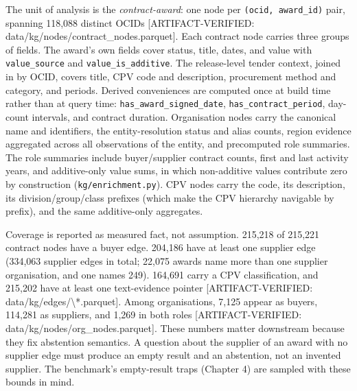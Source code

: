 The unit of analysis is the \emph{contract-award}: one node per \texttt{(ocid, award\_id)} pair, spanning 118,088 distinct OCIDs [ARTIFACT-VERIFIED: data/kg/nodes/contract\_nodes.parquet]. Each contract node carries three groups of fields. The award's own fields cover status, title, dates, and value with \texttt{value\_source} and \texttt{value\_is\_additive}. The release-level tender context, joined in by OCID, covers title, CPV code and description, procurement method and category, and periods. Derived conveniences are computed once at build time rather than at query time: \texttt{has\_award\_signed\_date}, \texttt{has\_contract\_period}, day-count intervals, and contract duration. Organisation nodes carry the canonical name and identifiers, the entity-resolution status and alias counts, region evidence aggregated across all observations of the entity, and precomputed role summaries. The role summaries include buyer/supplier contract counts, first and last activity years, and additive-only value sums, in which non-additive values contribute zero by construction (\texttt{kg/enrichment.py}). CPV nodes carry the code, its description, its division/group/class prefixes (which make the CPV hierarchy navigable by prefix), and the same additive-only aggregates.

Coverage is reported as measured fact, not assumption. 215,218 of 215,221 contract nodes have a buyer edge. 204,186 have at least one supplier edge (334,063 supplier edges in total; 22,075 awards name more than one supplier organisation, and one names 249). 164,691 carry a CPV classification, and 215,202 have at least one text-evidence pointer [ARTIFACT-VERIFIED: data/kg/edges/\textbackslash{}*.parquet]. Among organisations, 7,125 appear as buyers, 114,281 as suppliers, and 1,269 in both roles [ARTIFACT-VERIFIED: data/kg/nodes/org\_nodes.parquet]. These numbers matter downstream because they fix abstention semantics. A question about the supplier of an award with no supplier edge must produce an empty result and an abstention, not an invented supplier. The benchmark's empty-result traps (Chapter 4) are sampled with these bounds in mind.

